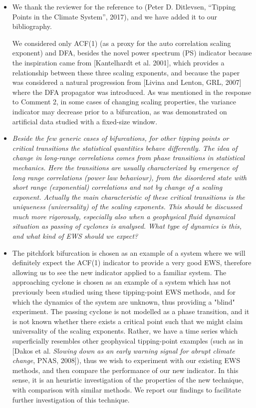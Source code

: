 \documentclass[12pt]{article}
\begin{document}
\begin{itemize}
\item[\bf Response.] 
We thank the reviewer for the reference to (Peter D. Ditlevsen, 
``Tipping Points in the Climate System'', 2017), and 
we have added it to our bibliography.

We considered only ACF(1) 
(as a proxy for the auto correlation scaling exponent) and DFA, 
besides the novel power spectrum (PS) indicator because the 
inspiration came from [Kantelhardt et al. 2001], which provides 
a relationship between these three scaling exponents, and because 
the paper was considered a natural progression from 
[Livina and Lenton, GRL, 2007] where the DFA propagator was 
introduced.
As was mentioned in the response to Comment 2, in some cases of changing
scaling properties, the variance indicator may decrease prior to a 
bifurcation, as was demonstrated on artificial data studied with a 
fixed-size window.

\item[\bf Comment 4.]
{\sl 
Beside the few generic cases of bifurcations, for other 
tipping points or critical transitions the statistical quantities 
behave differently. The idea of change in long-range correlations 
comes from phase transitions in statistical mechanics. 
Here the transitions are usually characterized by emergence of 
long range correlations (power law behaviour), from the disordered 
state with short range (exponential) correlations and not by change 
of a scaling exponent. Actually the main characteristic of these 
critical transitions is the uniqueness (universality) of the scaling 
exponents. This should be discussed much more rigorously, 
especially also when a geophysical fluid dynamical situation as 
passing of cyclones is analysed. What type of dynamics is this, 
and what kind of EWS should we expect?
}

\item[\bf Response.]
The pitchfork bifurcation is chosen as an example of a system where we 
will definitely expect the ACF(1) indicator to provide a very good EWS, 
therefore allowing us to see the new indicator applied to a familiar system. 
The approaching cyclone is chosen as an example of a system which 
has not previously been studied using these tipping-point 
EWS methods, and for which the dynamics of the system are unknown, 
thus providing a "blind" experiment. The passing cyclone is not 
modelled as a phase transition, and it is not known whether 
there exists a critical point such that we might claim universality 
of the scaling exponents. Rather, we have a time series which 
superficially resembles other geophysical tipping-point examples 
(such as in [Dakos et al. {\it Slowing down as an early warning 
signal for abrupt climate change}, PNAS, 2008]), thus we wish to 
experiment with our existing EWS methods, and then compare the 
performance of our new indicator. In this sense, it is an heuristic investigation of the properties of the new technique, with 
comparison with similar methods. We report our findings to facilitate
further investigation of this technique.


\end{itemize}
\end{document}
